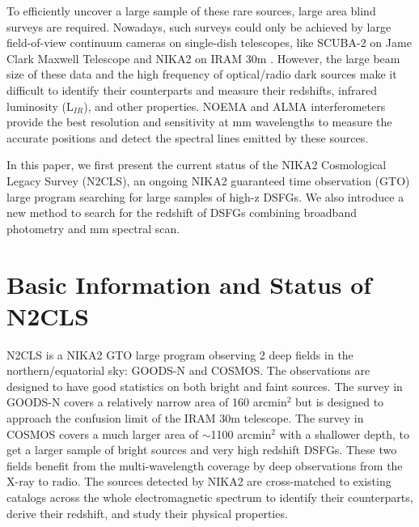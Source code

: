 \documentclass{webofc}
\newcommand{\GL}[1]{\textcolor{red}{[{\bf GL}: #1]}}
\begin{document}

To efficiently uncover a large sample of these rare sources, large area blind surveys are required. Nowadays, such surveys could only be achieved by large field-of-view continuum cameras on single-dish telescopes, like SCUBA-2 on Jame Clark Maxwell Telescope and NIKA2 on IRAM 30m \cite{NIKA2-performance, NIKA2-general, NIKA2-instrument, NIKA2-electronics}. However, the large beam size of these data and the high frequency of optical/radio dark sources make it difficult to identify their counterparts and measure their redshifts, infrared luminosity (L$_{IR}$), and other properties. NOEMA and ALMA interferometers provide the best resolution and sensitivity at mm wavelengths to measure the accurate positions and detect the spectral lines emitted by these sources.
 
 In this paper, we first present the current status of the NIKA2 Cosmological Legacy Survey (N2CLS), an ongoing NIKA2 guaranteed time observation (GTO) large program searching for large samples of high-z DSFGs. We also introduce a new method to search for the redshift of DSFGs combining broadband photometry and mm spectral scan.
 
 


\section{Basic Information and Status of N2CLS}
\label{sec-1}
N2CLS is a NIKA2 GTO large program observing 2 deep fields in the northern/equatorial sky: GOODS-N and COSMOS. The observations are designed to have good statistics on both bright and faint sources. The survey in GOODS-N covers a relatively narrow area of 160 arcmin$^2$ but is designed to approach the confusion limit of the IRAM 30m telescope. The survey in COSMOS covers a much larger area of $\sim$1100 arcmin$^2$ with a shallower depth, to get a larger sample of bright sources and very high redshift DSFGs. These two fields benefit from the multi-wavelength coverage by deep observations from the X-ray to radio. The sources detected by NIKA2 are cross-matched to existing catalogs across the whole electromagnetic spectrum to identify their counterparts, derive their redshift, and study their physical properties.
\end{document}
